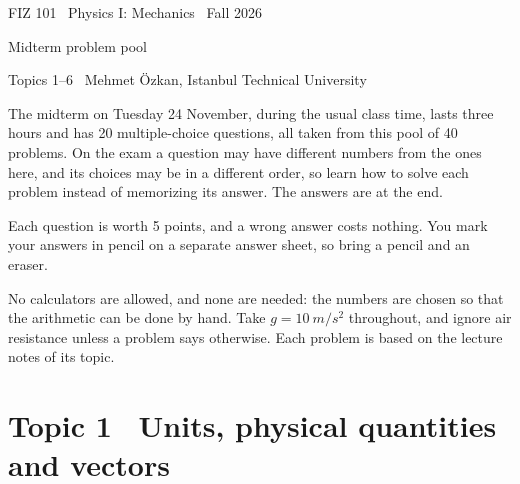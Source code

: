 \documentclass[11pt,a4paper]{article}
\newcommand{\pooltitle}[2]{%
  \thispagestyle{plain}%
  \begin{tcolorbox}[enhanced,colback=fzboard,colframe=fzboard,coltext=white,arc=2mm,boxrule=0pt,
      left=7mm,right=7mm,top=6mm,bottom=6mm,borderline south={2.5pt}{0pt}{fzyellow}]
    {\small\sffamily FIZ 101 \textperiodcentered\ Physics I: Mechanics \textperiodcentered\ Fall 2026}\par\vspace{2.5mm}
    {\sffamily\bfseries\LARGE\raggedright #1\par}\vspace{3mm}
    {\small\sffamily #2}
  \end{tcolorbox}\vspace{2mm}}
\newcounter{prob}
\begin{document}
\pooltitle{Midterm problem pool}{Topics 1--6 \textperiodcentered\ Mehmet \"Ozkan, Istanbul Technical University}

The midterm on Tuesday 24 November, during the usual class time, lasts three hours and has 20
multiple-choice questions, all taken from this pool of 40 problems. On the exam a question may have
different numbers from the ones here, and its choices may be in a different order, so learn how to
solve each problem instead of memorizing its answer. The answers are at the end.

Each question is worth 5 points, and a wrong answer costs nothing. You mark your answers in pencil on
a separate answer sheet, so bring a pencil and an eraser.

No calculators are allowed, and none are needed: the numbers are chosen so that the arithmetic can be
done by hand. Take $g = \qty{10}{m/s^2}$ throughout, and ignore air resistance unless a problem says
otherwise. Each problem is based on the lecture notes of its topic.


\section*{Topic 1 \textperiodcentered\ Units, physical quantities and vectors}
\end{document}
